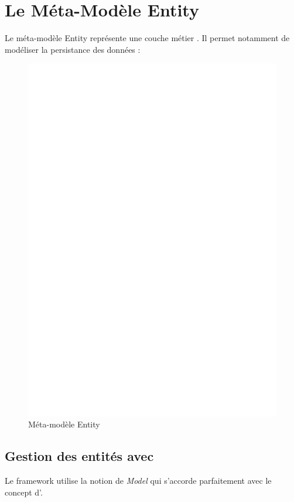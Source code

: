 \section{Le Méta-Modèle Entity}\label{sub:ent}
Le méta-modèle Entity représente une couche \og métier \fg{}. Il permet notamment de modéliser la persistance des données :  

\begin{figure}[htb]
  \centering
  \includegraphics[scale=.4]{img/Entity.eps}
  \caption{Méta-modèle Entity}
  \label{fig:ent}
\end{figure}



\subsection{Gestion des entités avec \kwplay{}}
Le framework \kwplay{} utilise la notion de \textit{Model} qui s'accorde parfaitement avec le concept d'\kwentity{}. 

